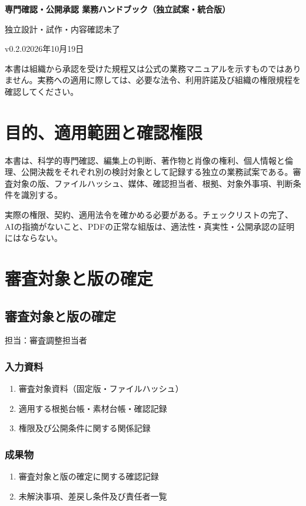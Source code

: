 \documentclass[a4paper,11pt]{article}
\begin{document}
\begin{center}
{\Large\bfseries 専門確認・公開承認 業務ハンドブック（独立試案・統合版）}\par\medskip
{\small 独立設計・試作・内容確認未了}\par
{\small v0.2.0\quad 2026年10月19日}\par
\end{center}
\vspace{6mm}
\noindent 本書は組織から承認を受けた規程又は公式の業務マニュアルを示すものではありません。実務への適用に際しては、必要な法令、利用許諾及び組織の権限規程を確認してください。\par
\tableofcontents
\clearpage
\section{目的、適用範囲と確認権限}
\par 本書は、科学的専門確認、編集上の判断、著作物と肖像の権利、個人情報と倫理、公開決裁をそれぞれ別の検討対象として記録する独立の業務試案である。審査対象の版、ファイルハッシュ、媒体、確認担当者、根拠、対象外事項、判断条件を識別する。\par\medskip
\par 実際の権限、契約、適用法令を確かめる必要がある。チェックリストの完了、AIの指摘がないこと、PDFの正常な組版は、適法性・真実性・公開承認の証明にはならない。\par\medskip
\section{審査対象と版の確定}
\subsection{審査対象と版の確定}
\par 担当：審査調整担当者\par\medskip
\subsubsection*{入力資料}
\begin{enumerate}[leftmargin=2em,itemsep=0.35em]
\item 審査対象資料（固定版・ファイルハッシュ）
\item 適用する根拠台帳・素材台帳・確認記録
\item 権限及び公開条件に関する関係記録
\end{enumerate}
\subsubsection*{成果物}
\begin{enumerate}[leftmargin=2em,itemsep=0.35em]
\item 審査対象と版の確定に関する確認記録
\item 未解決事項、差戻し条件及び責任者一覧
\end{enumerate}
\end{document}

